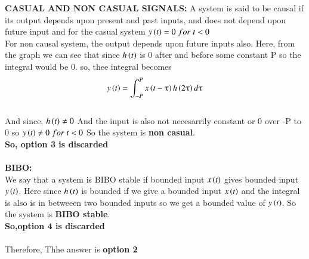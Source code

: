 \documentclass[journal,12pt,twocolumn]{IEEEtran}
\begin{document}
\textbf{CASUAL AND NON CASUAL SIGNALS:}
A system is said to be causal if its output depends upon
present and past inputs, and does not depend upon future
input and for the casual system $y\left(t\right)= 0\; for\; t<0$\\
For non causal system, the output depends upon future inputs
also. 
Here, from the graph we can see that since $h\left(t\right)$ is 0 after and before some constant P so the integral would be 0.
so, thee integral becomes $$y\left(t\right)=\int_{-P}^{P}x\left(t-\uptau\right)h\left(2\uptau\right)d\uptau $$\\
And since, $h\left(t\right) \neq 0 $ And the input is also not necesarrily constant or 0 over -P to 0 so $y \left(t\right) \neq 0\; for\; t<0$ So the system is \textbf{non casual}.\\
\textbf{So, option 3 is discarded}\\\\
\textbf{BIBO:}\\
We say that a system is BIBO stable if bounded input $x \left(t\right)$ gives bounded input $y\left(t\right)$.
Here since $h\left(t\right)$ is bounded if we give a bounded input $x\left(t\right)$ and the integral is also is in betweeen two bounded inputs so we get a bounded value of $y\left(t\right)$.
So the system is \textbf{BIBO stable}.\\
 \textbf{So,option 4 is discarded}\\\\
 Therefore, Thhe answer is \textbf{option 2}
 
\end{document}
